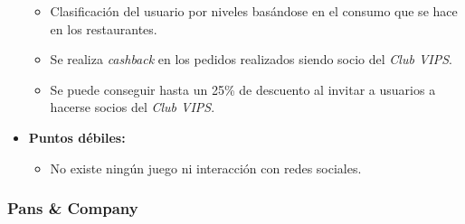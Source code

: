 \documentclass[twoside]{report}
\begin{document}
\begin{itemize}
\begin{itemize}
	\item Clasificación del usuario por niveles basándose en el consumo que se hace en los restaurantes.
	\item Se realiza \textit{cashback} en los pedidos realizados siendo socio del \textit{Club VIPS}.
	\item Se puede conseguir hasta un 25\% de descuento al invitar a usuarios a hacerse socios del \textit{Club VIPS}.
	\end{itemize}
\item \textbf{Puntos débiles:}
	\begin{itemize}
	\item No existe ningún juego ni interacción con redes sociales.
	\end{itemize}
\end{itemize}

\subsubsection{Pans \& Company}
\end{document}
